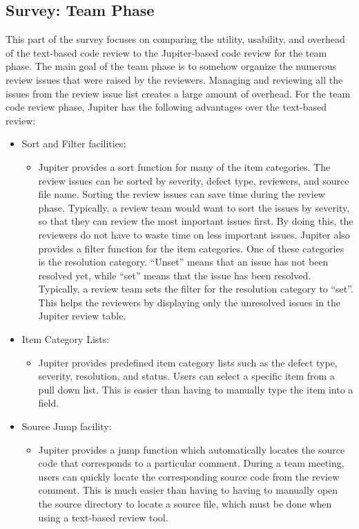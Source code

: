 \subsection{Survey: Team Phase}
\label{subsec:survey:-team-phase}

This part of the survey focuses on comparing the utility, usability, and overhead of the text-based code review to the Jupiter-based code review for the team phase. The main goal of the team phase is to somehow organize the numerous review issues that were raised by the reviewers. Managing and reviewing all the issues from the review issue list creates a large amount of overhead. For the team code review phase, Jupiter has the following advantages over the text-based review:

\begin{itemize}
	\item Sort and Filter facilities:
		\begin{itemize}
			\item Jupiter provides a sort function for many of the item categories. The review issues can be sorted by severity, defect type, reviewers, and source file name. Sorting the review issues can save time during the review phase. Typically, a review team would want to sort the issues by severity, so that they can review the most important issues first. By doing this, the reviewers do not have to waste time on less important issues. Jupiter also provides a filter function for the item categories. One of these categories is the resolution category. ``Unset'' means that an issue has not been resolved yet, while ``set'' means that the issue has been resolved. Typically, a review team sets the filter for the resolution category to ``set''. This helps the reviewers by displaying only the unresolved issues in the Jupiter review table.
		\end{itemize}
	\item Item Category Lists:	
		\begin{itemize}
			\item Jupiter provides predefined item category lists such as the defect type, severity, resolution, and status. Users can select a specific item from a pull down list. This is easier than having to manually type the item into a field.
		\end{itemize}
	\item Source Jump facility:
		\begin{itemize}
			\item Jupiter provides a jump function which automatically locates the source code that corresponds to a particular comment. During a team meeting, users can quickly locate the corresponding source code from the review comment. This is much easier than having to having to manually open the source directory to locate a source file, which must be done when using a text-based review tool.
		\end{itemize}
\end{itemize}

